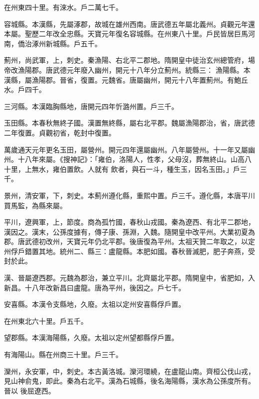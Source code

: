 \begin{pinyinscope}
 在州東四十里。有淶水。戶二萬七千。



 容城縣。本漢縣，先屬涿郡，故城在雄州西南。唐武德五年屬北義州。貞觀元年還本屬。聖歷二年改全忠縣。天寶元年復名容城縣。在州東八十里。戶民皆居巨馬河南，僑治涿州新城縣。戶五千。



 薊州，尚武軍，上，刺史。秦漁陽、右北平二郡地。隋開皇中徒治玄州總管府，場帝改漁陽郡。唐武德元年廢入幽州，開元十八年分立薊州。統縣三：
 漁陽縣。本漢縣，屬漁陽郡。晉省，復置。元魏省。唐屬幽州，開元十八年置薊州。有鮑丘水。戶四千。



 三河縣。本漢臨胸縣地，唐開元四年忻潞州置。戶三千。



 玉田縣。本春秋無終子國。漢置無終縣，屬右北平郡。魏屬漁陽郡治，省，唐武德二年復置。貞觀初省，乾封中復置。



 萬歲通天元年更名玉田，屬營州。開元四年還屬幽州。八年屬營州。十一年又屬幽州。十八年來屬。《搜神記》：「雍伯，洛陽人，性孝，父母沒，葬無終山。山高八十里，上無水，雍伯置飲。人就有
 飲者，與石一斗，種生玉，因名玉田。」戶三千。



 景州，清安軍，下，刺史。本薊州遵化縣，重熙中置。戶三千。遵化縣，本唐平川買馬監，為縣來屬。



 平川，遼興軍，上，節度。商為孤竹國，春秋山戎國。秦為遼西、有北平二郡地，漢因之。漢末，公孫度據有，傳子康、孫淵，入魏。隨開皇中改平州。大業初夏為郡。唐武德初改州，天寶元年仍北平郡。後唐復為平州。太祖天贊二年取之，以定州俘戶錯置其地。統州二、縣三：盧龍縣。本肥如國。春秋晉滅肥，肥子奔燕，受封於此。



 漢、晉屬遼西郡。元魏為郡治，兼立平川。北齊屬北平郡。隋開皇中，省肥如，入新昌。十八年改新昌曰盧龍。唐為平州，後因之。戶七千。



 安喜縣。本漢令支縣地，久廢。太祖以定州安喜縣俘戶置。



 在州東北六十里。戶五千。



 望郡縣。本漢海陽縣，久廢。太祖以定州望都縣俘戶置。



 有海陽山。縣在州商三十里。戶三千。



 灤州，永安軍，中，刺史。本古黃洛城。灤河環繞，在盧龍山南。齊桓公伐山戎，見山神俞鬼，即此。秦為右北平。漢為石城縣，後名海陽縣，漢水為公孫度所有。晉以
 後屈遼西。




\end{pinyinscope}

